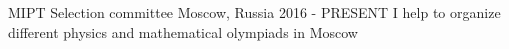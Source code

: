 \begin{cventries}
   \cventry
    {MIPT}
    {Selection committee}
    {Moscow, Russia}
    {2016 - PRESENT }
    {
        I help to organize different physics and mathematical olympiads in Moscow
    }
\end{cventries}

